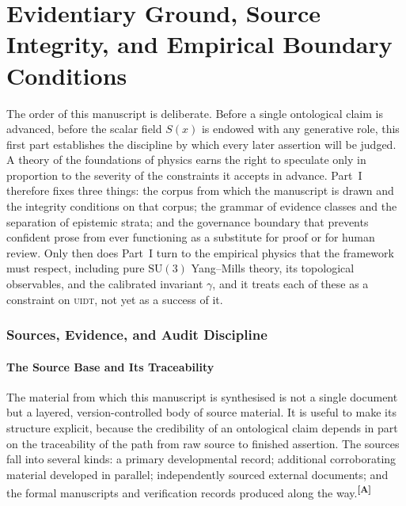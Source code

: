 \documentclass[12pt,a4paper,twoside]{article}
\theoremstyle{plain}
\theoremstyle{definition}
\theoremstyle{remark}
\newcommand{\UIDT}{\textsc{uidt}}
\newcommand{\catmark}[1]{\textsuperscript{\textsf{\textbf{[#1]}}}}
\newcommand{\Sx}{S(x)}
\begin{document}
\newpage

\part{Evidentiary Ground, Source Integrity, and Empirical Boundary Conditions}
\label{part:evidentiary-ground}

\noindent The order of this manuscript is deliberate. Before a single ontological claim is advanced, before the scalar field $\Sx$ is endowed with any generative role, this first part establishes the discipline by which every later assertion will be judged. A theory of the foundations of physics earns the right to speculate only in proportion to the severity of the constraints it accepts in advance. Part~I therefore fixes three things: the corpus from which the manuscript is drawn and the integrity conditions on that corpus; the grammar of evidence classes and the separation of epistemic strata; and the governance boundary that prevents confident prose from ever functioning as a substitute for proof or for human review. Only then does Part~I turn to the empirical physics that the framework must respect, including pure $\mathrm{SU}(3)$ Yang--Mills theory, its topological observables, and the calibrated invariant $\gamma$, and it treats each of these as a constraint on \UIDT, not yet as a success of it.

\newpage
\section{Sources, Evidence, and Audit Discipline}
\label{sec:corpus-ledger-audit}

\subsection{The Source Base and Its Traceability}
\label{subsec:corpus-topology}

The material from which this manuscript is synthesised is not a single document but a layered, version-controlled body of source material. It is useful to make its structure explicit, because the credibility of an ontological claim depends in part on the traceability of the path from raw source to finished assertion. The sources fall into several kinds: a primary developmental record; additional corroborating material developed in parallel; independently sourced external documents; and the formal manuscripts and verification records produced along the way.\catmark{A}
\end{document}
